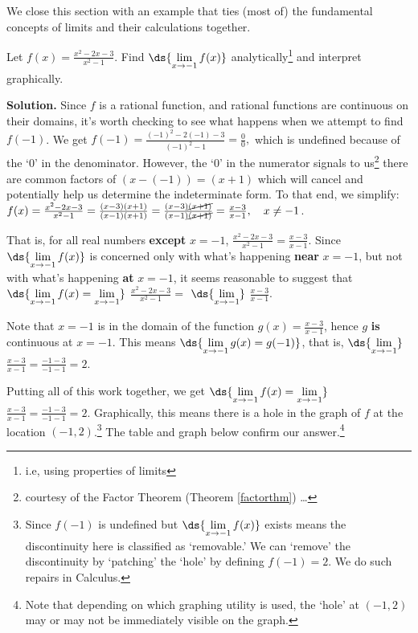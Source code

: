 \documentclass{ximera}
\begin{document}
\medskip

We close this section with an example that ties (most of) the fundamental concepts of limits and their calculations together.

\medskip

\begin{example} \label{rationallimit}  Let  $f(x) =  \frac{x^2-2x-3}{x^2-1}$.  Find $\ds{\lim_{x \rightarrow -1} f(x)}$ analytically\footnote{i.e, using properties of limits} and interpret graphically.

\medskip

{\bf Solution.}  Since $f$ is a rational function, and rational functions are continuous on their domains, it's worth checking to see what happens when we attempt to find $f(-1)$.  We get  $f(-1) = \frac{(-1)^2 - 2(-1)-3}{(-1)^2-1} = \frac{0}{0},$ which is undefined because of the `$0$' in the denominator.  However, the `$0$' in the numerator signals to us\footnote{courtesy of the Factor Theorem (Theorem \ref{factorthm}) \ldots} there are common factors of $(x-(-1)) = (x+1)$ which will cancel and potentially help us determine the indeterminate form.  To that end, we simplify: $f(x) =  \frac{x^2-2x-3}{x^2-1} = \frac{(x-3)(x+1)}{(x-1)(x+1)} = \frac{(x-3)\cancel{(x+1)}}{(x-1)\cancel{(x+1)}} = \frac{x-3}{x-1}, \quad x \neq -1$. 

\medskip

That is, for all real numbers \textbf{except} $x = -1$, $\frac{x^2-2x-3}{x^2-1} = \frac{x-3}{x-1}$.   Since $\ds{\lim_{x \rightarrow -1} f(x)}$ is concerned only with what's happening \textbf{near} $x = -1$, but not with what's happening \textbf{at} $x = -1$, it seems reasonable to suggest that $\ds{\lim_{x \rightarrow -1} f(x) =  \lim_{x \rightarrow -1}}$  $\frac{x^2-2x-3}{x^2-1} =$  $\ds{\lim_{x \rightarrow -1}}$ $\frac{x-3}{x-1}$.

\medskip

Note that $x = -1$ is in the domain of the function $g(x) = \frac{x-3}{x-1}$, hence $g$  \textbf{is} continuous at $x = -1$.   This means $\ds{\lim_{x \rightarrow -1} g(x) = g(-1)}$, that is, $\ds{\lim_{x \rightarrow -1}}$ $\frac{x-3}{x-1} = \frac{-1-3}{-1-1} = 2$.

\medskip

Putting all of this work together, we get $\ds{\lim_{x \rightarrow -1} f(x) =   \lim_{x \rightarrow -1}}$ $ \frac{x-3}{x-1}  =  \frac{-1-3}{-1-1} = 2$.   Graphically, this means there is a hole in the graph of $f$ at the location $(-1,2)$.\footnote{Since $f(-1)$ is undefined but  $\ds{\lim_{x \rightarrow -1} f(x)}$ exists means the discontinuity here is classified as `removable.'  We can `remove' the discontinuity by `patching' the `hole' by defining $f(-1) = 2$. We do such repairs in Calculus.}  The table and graph below confirm our answer.\footnote{Note that depending on which graphing utility is used, the `hole' at $(-1,2)$ may or may not be immediately visible on the graph.}


\end{example}
\end{document}

